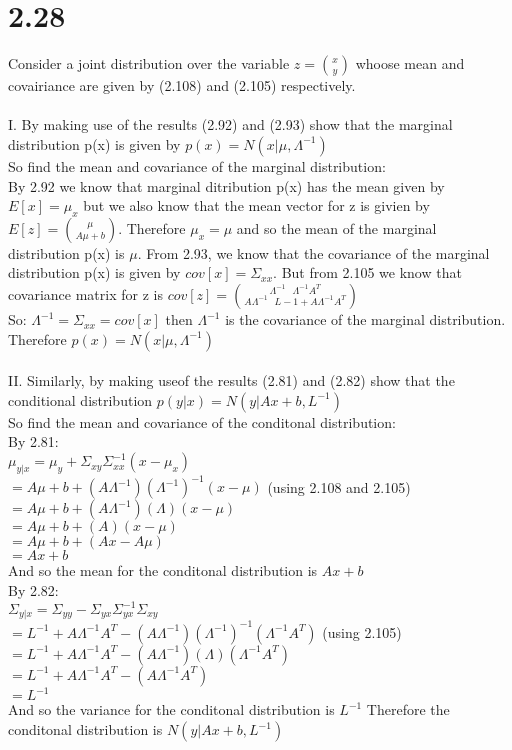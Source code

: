\documentclass[11pt,leqno,fleqn]{article}
\begin{document}
\section{2.28}
Consider a joint distribution over the variable $z =  \binom {x} {y}$ whoose mean and covairiance are given by (2.108) and (2.105) respectively.  
\\
\\
I. By making use of the results (2.92) and (2.93) show that the marginal distribution p(x) is given by  $p(x) = N(x| \mu , \Lambda ^{-1})$\\
 So find the mean and covariance of the marginal distribution:\\
By 2.92 we know that marginal  ditribution p(x) has the mean given by $E[x] = \mu_x$  but we also know that the mean vector for z is givien by $E[z] = \binom{\mu}{A \mu + b}$. Therefore $ \mu_x = \mu $ and so the mean of the marginal distribution p(x) is $\mu$.  From 2.93, we know that the covariance of the marginal distribution p(x) is given by $cov[x] = \Sigma_{xx}$. But from 2.105 we know that covariance matrix for z is
$cov[z] =  \binom {\Lambda^{-1} \ \ \    \Lambda^{-1}A^T} {A \Lambda^{-1} \ \ \ L-1 + A \Lambda^{-1} A^T}$\\
So: $ \Lambda^{-1} = \Sigma_{xx} = cov[x] $ then $\Lambda^{-1}$ is the covariance of the marginal distribution. Therefore $p(x) = N(x| \mu , \Lambda^{-1})$\\
\\
 II. Similarly, by making useof the results (2.81) and (2.82) show that the conditional distribution $p(y|x) = N(y| Ax+b, L^{-1})$\\
 So find the mean and covariance of the conditonal distribution:\\
By 2.81:\\
 $\mu_{y|x} = \mu_y + \Sigma_{xy} \Sigma_{xx}^{-1} (x - \mu_x)$\\
$ = A \mu + b + (A \Lambda^{-1})(\Lambda^{-1})^{-1}(x - \mu)  $ (using 2.108 and 2.105)\\
$ = A \mu + b + (A \Lambda^{-1})(\Lambda)(x - \mu)  $\\
$ = A \mu + b + (A )(x - \mu)  $\\
$ = A \mu + b + (Ax - A\mu)  $\\
$ =  Ax + b $\\
And so the mean for the conditonal distribution is $Ax + b$\\

By 2.82:\\
$\Sigma_{y|x} = \Sigma_{yy} - \Sigma_{yx} \Sigma_{yx}^{-1} \Sigma_{xy}$\\
$= L^{-1} + A \Lambda^{-1} A^{T} - (A \Lambda^{-1})(\Lambda^{-1})^{-1}(\Lambda^{-1} A^T)$ (using 2.105)\\
$= L^{-1} + A \Lambda^{-1} A^{T} - (A \Lambda^{-1})(\Lambda)(\Lambda^{-1} A^T)$\\
$= L^{-1} + A \Lambda^{-1} A^{T} - (A \Lambda^{-1} A^T)$\\
$= L^{-1}$\\
And so the variance for the conditonal distribution is $L^{-1}$ Therefore the conditonal distribution is $N(y| Ax+b, L^{-1})$
\end{document}
